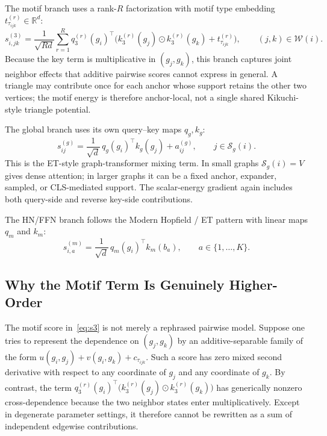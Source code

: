 \documentclass[11pt,a4paper]{article}
\begin{document}
The motif branch uses a rank-$R$ factorization with motif type embedding
$t_{\tau_{ijk}}^{(r)}\in\mathbb{R}^{d}$:
\begin{equation}
  s^{(3)}_{i,jk}
  = \frac{1}{\sqrt{Rd}}\sum_{r=1}^{R}
      {q_3^{(r)}(g_i)}^\top
      \bigl(k_3^{(r)}(g_j)\odot k_3^{(r)}(g_k) + t_{\tau_{ijk}}^{(r)}\bigr),
  \qquad (j,k)\in\mathcal{W}(i).
  \label{eq:s3}
\end{equation}
Because the key term is multiplicative in $(g_j,g_k)$, this branch captures
joint neighbor effects that additive pairwise scores cannot express in
general. A triangle may contribute once for each anchor whose support retains
the other two vertices; the motif energy is therefore anchor-local, not a single
shared Kikuchi-style triangle potential.

The global branch uses its own query--key maps $q_g,k_g$:
\begin{equation}
  s^{(g)}_{ij}
  = \frac{1}{\sqrt d}\,q_g(g_i)^\top k_g(g_j) + a^{(g)}_{ij},
  \qquad j\in\mathcal S_g(i).
  \label{eq:sg}
\end{equation}
This is the ET-style graph-transformer mixing term. In small graphs
$\mathcal S_g(i)=V$ gives dense attention; in larger graphs it can be a fixed
anchor, expander, sampled, or CLS-mediated support. The scalar-energy gradient
again includes both query-side and reverse key-side contributions.

The HN/FFN branch follows the Modern Hopfield / ET pattern with linear maps
$q_m$ and $k_m$:
\begin{equation}
  s^{(m)}_{i,a}
  = \frac{1}{\sqrt d}\,q_m(g_i)^\top k_m(b_a),
  \qquad a\in\{1,\dots,K\}.
  \label{eq:sm}
\end{equation}

\subsection{Why the Motif Term Is Genuinely Higher-Order}

The motif score in~\eqref{eq:s3} is not merely a rephrased pairwise model.
Suppose one tries to represent the dependence on $(g_j,g_k)$ by an
additive-separable family of the form
$u(g_i,g_j)+v(g_i,g_k)+c_{\tau_{ijk}}$. Such a score has zero mixed second
derivative with respect to any coordinate of $g_j$ and any coordinate of
$g_k$. By contrast, the term
${q_3^{(r)}(g_i)}^\top\bigl(k_3^{(r)}(g_j)\odot k_3^{(r)}(g_k)\bigr)$ has
generically nonzero cross-dependence because the two neighbor states enter
multiplicatively. Except in degenerate parameter settings, it therefore
cannot be rewritten as a sum of independent edgewise contributions.
\end{document}
